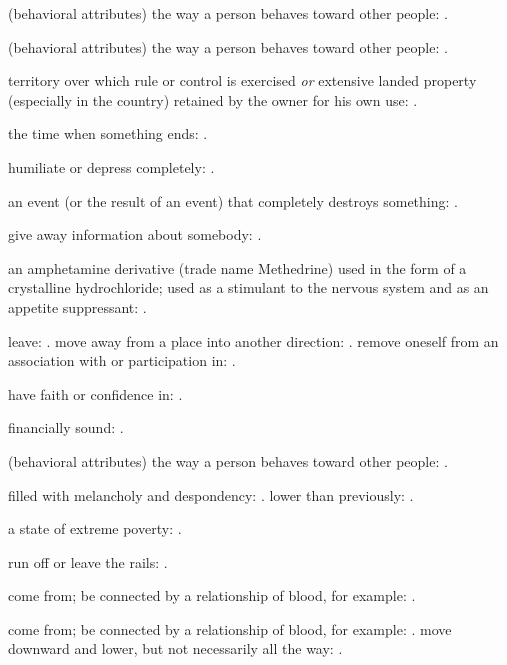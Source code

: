   (behavioral attributes) the way a person behaves toward other people: .

  (behavioral attributes) the way a person behaves toward other people: .

  territory over which rule or control is exercised \textit{or} extensive landed property (especially in the country) retained by the owner for his own use: .

  the time when something ends: .

  humiliate or depress completely: .

  an event (or the result of an event) that completely destroys something: .

  give away information about somebody: .

  an amphetamine derivative (trade name Methedrine) used in the form of a crystalline hydrochloride; used as a stimulant to the nervous system and as an appetite suppressant: .

  leave: . move away from a place into another direction: . remove oneself from an association with or participation in: .

  have faith or confidence in: .

  financially sound: .

  (behavioral attributes) the way a person behaves toward other people: .

  filled with melancholy and despondency: . lower than previously: .

  a state of extreme poverty: .

  run off or leave the rails: .

  come from; be connected by a relationship of blood, for example: .

  come from; be connected by a relationship of blood, for example: . move downward and lower, but not necessarily all the way: .

